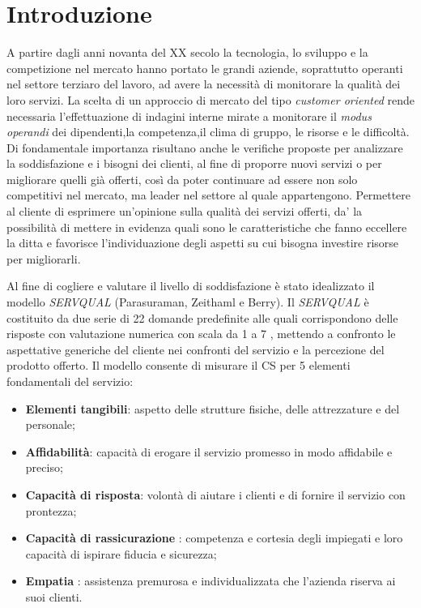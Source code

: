 \section{Introduzione}
A partire dagli anni novanta del XX secolo la tecnologia, lo sviluppo e la
competizione nel mercato hanno portato le grandi aziende, soprattutto operanti nel settore
terziaro del lavoro, ad avere la necessità di monitorare la qualità dei loro
servizi. 
La scelta di un approccio di mercato del tipo \emph{customer
oriented} rende necessaria l'effettuazione di indagini interne
mirate a monitorare il \emph{modus operandi} dei dipendenti,la competenza,il clima di gruppo, le
risorse e le difficoltà. Di fondamentale importanza risultano anche le verifiche
proposte per analizzare la soddisfazione e i bisogni dei clienti, al fine di
proporre nuovi servizi o per migliorare quelli già offerti, così da poter
continuare ad essere non solo competitivi nel mercato, ma leader nel settore al
quale appartengono. Permettere al cliente di esprimere un'opinione sulla qualità
dei servizi offerti, da' la possibilità di mettere in evidenza quali sono le
caratteristiche che fanno eccellere la ditta e favorisce l'individuazione degli
aspetti su cui bisogna investire risorse per migliorarli.

Al fine di cogliere e valutare il livello di soddisfazione è stato idealizzato
il modello \emph{SERVQUAL} (Parasuraman, Zeithaml e Berry). Il
\emph{SERVQUAL} è costituito da due serie di 22 domande predefinite alle quali
corrispondono delle risposte con valutazione numerica con scala da 1 a 7 ,
mettendo a confronto le aspettative generiche del cliente nei confronti del
servizio e la percezione del prodotto offerto.
Il modello  consente di misurare il CS per 5 elementi fondamentali del
servizio: 
\begin{itemize}
  \item \textbf{Elementi tangibili}: aspetto delle strutture fisiche,
  delle attrezzature e del personale;
  \item \textbf{Affidabilità}: capacità di erogare il servizio promesso
  in modo affidabile e preciso;
  \item \textbf{Capacità di risposta}: volontà di aiutare i clienti e di
  fornire il servizio con prontezza;
  \item \textbf{Capacità di rassicurazione} : competenza e cortesia
  degli impiegati e loro capacità di  ispirare fiducia e sicurezza;
  \item \textbf{Empatia} : assistenza premurosa e individualizzata che
  l’azienda riserva ai suoi clienti.
\end{itemize}

